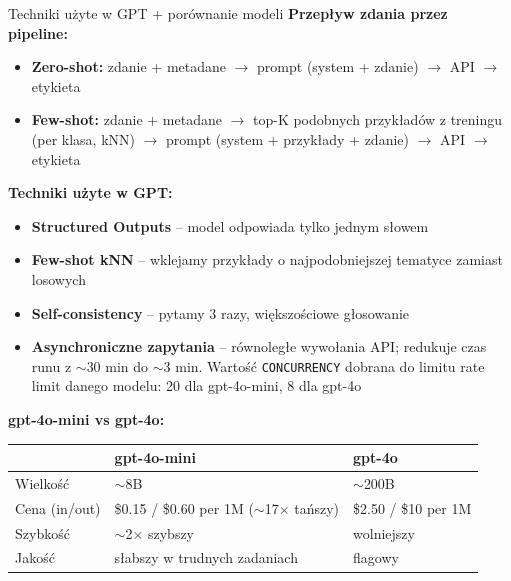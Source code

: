 \documentclass[10pt]{beamer}
\begin{document}
\begin{frame}{Techniki użyte w GPT + porównanie modeli}
  \scriptsize
  \textbf{Przepływ zdania przez pipeline:}
  \begin{itemize}
    \item \textbf{Zero-shot:} zdanie + metadane $\to$ prompt (system + zdanie)
          $\to$ API $\to$ etykieta
    \item \textbf{Few-shot:} zdanie + metadane $\to$ top-K podobnych
          przykładów z treningu (per klasa, kNN) $\to$ prompt
          (system + przykłady + zdanie) $\to$ API $\to$ etykieta
  \end{itemize}

  \vspace{0.3em}
  \textbf{Techniki użyte w GPT:}
  \begin{itemize}
    \item \textbf{Structured Outputs} -- model odpowiada tylko jednym słowem
    \item \textbf{Few-shot kNN} -- wklejamy przykłady o najpodobniejszej
          tematyce zamiast losowych
    \item \textbf{Self-consistency} -- pytamy 3 razy, większościowe głosowanie
    \item \textbf{Asynchroniczne zapytania} -- równoległe wywołania API;
          redukuje czas runu z $\sim$30 min do $\sim$3 min. Wartość
          \texttt{CONCURRENCY} dobrana do limitu rate limit danego modelu:
          20 dla gpt-4o-mini, 8 dla gpt-4o
  \end{itemize}

  \vspace{0.3em}
  \textbf{gpt-4o-mini vs gpt-4o:}
  \begin{center}
  \begin{tabular}{lll}
    \toprule
     & \textbf{gpt-4o-mini} & \textbf{gpt-4o} \\
    \midrule
    Wielkość       & $\sim$8B & $\sim$200B \\
    Cena (in/out)  & \$0.15 / \$0.60 per 1M ($\sim$17$\times$ tańszy) & \$2.50 / \$10 per 1M \\
    Szybkość       & $\sim$2$\times$ szybszy & wolniejszy \\
    Jakość         & słabszy w trudnych zadaniach & flagowy \\
    \bottomrule
  \end{tabular}
  \end{center}
\end{frame}
\end{document}
